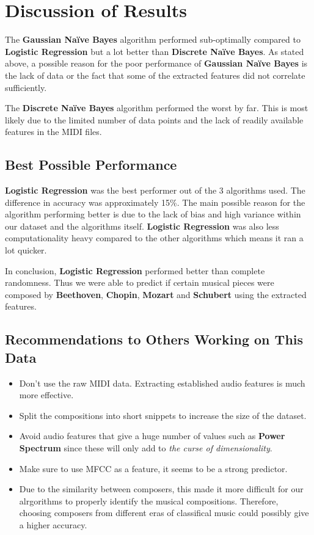 \documentclass[11pt]{article}
\providecommand{\tightlist}{%
      \setlength{\itemsep}{0pt}\setlength{\parskip}{0pt}}
\begin{document}
    \section{Discussion of Results}\label{discussion-of-results}

The \textbf{Gaussian Naïve Bayes} algorithm performed sub-optimally
compared to \textbf{Logistic Regression} but a lot better than
\textbf{Discrete Naïve Bayes}. As stated above, a possible reason for
the poor performance of \textbf{Gaussian Naïve Bayes} is the lack of
data or the fact that some of the extracted features did not correlate
sufficiently.

The \textbf{Discrete Naïve Bayes} algorithm performed the worst by far.
This is most likely due to the limited number of data points and the
lack of readily available features in the MIDI files.

\subsection{Best Possible Performance}\label{best-possible-performance}

\textbf{Logistic Regression} was the best performer out of the 3
algorithms used. The difference in accuracy was approximately 15\%. The
main possible reason for the algorithm performing better is due to the
lack of bias and high variance within our dataset and the algorithms
itself. \textbf{Logistic Regression} was also less computationality
heavy compared to the other algorithms which means it ran a lot quicker.

In conclusion, \textbf{Logistic Regression} performed better than
complete randomness. Thus we were able to predict if certain musical
pieces were composed by \textbf{Beethoven}, \textbf{Chopin},
\textbf{Mozart} and \textbf{Schubert} using the extracted features.

\subsection{Recommendations to Others Working on This
Data}\label{recommendations-to-others-working-on-this-data}

\begin{itemize}
\tightlist
\item
  Don't use the raw MIDI data. Extracting established audio features is
  much more effective.
\item
  Split the compositions into short snippets to increase the size of the
  dataset.
\item
  Avoid audio features that give a huge number of values such as
  \textbf{Power Spectrum} since these will only add to \emph{the curse
  of dimensionality}.
\item
  Make sure to use MFCC as a feature, it seems to be a strong predictor.
\item
  Due to the similarity between composers, this made it more difficult
  for our alrgorithms to properly identify the musical compositions.
  Therefore, choosing composers from different eras of classifical music
  could possibly give a higher accuracy.
\end{itemize}
\end{document}
